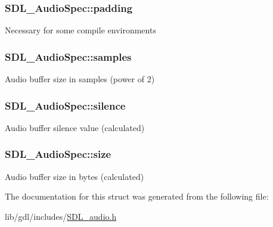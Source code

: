 \subsubsection[{padding}]{ S\+D\+L\+\_\+\+Audio\+Spec\+::padding}\label{struct_s_d_l___audio_spec_a738371fc13b54cefef4db16994abeeb6}
Necessary for some compile environments \hypertarget{struct_s_d_l___audio_spec_a2cdf5e885808c10bfa2810b706e69f95}{}
\subsubsection[{samples}]{ S\+D\+L\+\_\+\+Audio\+Spec\+::samples}\label{struct_s_d_l___audio_spec_a2cdf5e885808c10bfa2810b706e69f95}
Audio buffer size in samples (power of 2) \hypertarget{struct_s_d_l___audio_spec_addc462c8a806e6c122eccf63482048f6}{}
\subsubsection[{silence}]{ S\+D\+L\+\_\+\+Audio\+Spec\+::silence}\label{struct_s_d_l___audio_spec_addc462c8a806e6c122eccf63482048f6}
Audio buffer silence value (calculated) \hypertarget{struct_s_d_l___audio_spec_a154cf44743ecec78c36dc6c827dd2fdb}{}
\subsubsection[{size}]{ S\+D\+L\+\_\+\+Audio\+Spec\+::size}\label{struct_s_d_l___audio_spec_a154cf44743ecec78c36dc6c827dd2fdb}
Audio buffer size in bytes (calculated) 

The documentation for this struct was generated from the following file\+:\begin{DoxyCompactItemize}
\item 
lib/gdl/includes/\hyperlink{_s_d_l__audio_8h}{S\+D\+L\+\_\+audio.\+h}\end{DoxyCompactItemize}
